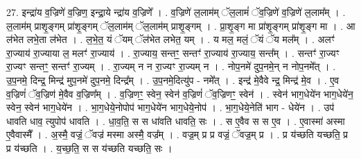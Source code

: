 \documentclass[17pt]{extarticle}
\begin{document}
27. इन्द्रा॑य व॒ज्रिणे॑ व॒ज्रिण॒ इन्द्रा॒ये न्द्रा॑य व॒ज्रिणे᳚ । . व॒ज्रिणे॑ ल॒लाम॑म् ॅल॒लामं॑ ॅव॒ज्रिणे॑ व॒ज्रिणे॑ ल॒लाम᳚म् । . ल॒लाम॑म् प्राशृ॒ङ्गम् प्रा॑शृ॒ङ्गम् ॅल॒लाम॑म् ॅल॒लाम॑म् प्राशृ॒ङ्गम् । . प्रा॒शृ॒ङ्ग मा प्रा॑शृ॒ङ्गम् प्रा॑शृ॒ङ्ग मा । . आ ल॑भेत लभे॒ता ल॑भेत । . ल॒भे॒त॒ यं ॅयम् ॅल॑भेत लभेत॒ यम् । . य मल॒ मलं॒ ॅयं ॅय मल᳚म् । . अलꣳ॑ रा॒ज्याय॑ रा॒ज्याया ल॒ मलꣳ॑ रा॒ज्याय॑ । . रा॒ज्याय॒ सन्तꣳ॒॒ सन्तꣳ॑ रा॒ज्याय॑ रा॒ज्याय॒ सन्त᳚म् । . सन्तꣳ॑ रा॒ज्यꣳ रा॒ज्यꣳ सन्तꣳ॒॒ सन्तꣳ॑ रा॒ज्यम् । . रा॒ज्यम् न न रा॒ज्यꣳ रा॒ज्यम् न । . नोप॒नमे॑ दुप॒नमे॒न् न नोप॒नमे᳚त् । . उ॒प॒नमे॒ दिन्द्र॒ मिन्द्र॑ मुप॒नमे॑ दुप॒नमे॒ दिन्द्र᳚म् । . उ॒प॒नमे॒दित्यु॑प - नमे᳚त् । . इन्द्र॑ मे॒वैवे न्द्र॒ मिन्द्र॑ मे॒व । . ए॒व व॒ज्रिणं॑ ॅव॒ज्रिण॑ मे॒वैव व॒ज्रिण᳚म् । . व॒ज्रिणꣳ॒॒ स्वेन॒ स्वेन॑ व॒ज्रिणं॑ ॅव॒ज्रिणꣳ॒॒ स्वेन॑ । . स्वेन॑ भाग॒धेये॑न भाग॒धेये॑न॒ स्वेन॒ स्वेन॑ भाग॒धेये॑न । . भा॒ग॒धेये॒नोपोप॑ भाग॒धेये॑न भाग॒धेये॒नोप॑ । . भा॒ग॒धेये॒नेति॑ भाग - धेये॑न । . उप॑ धावति धाव॒ त्युपोप॑ धावति । . धा॒व॒ति॒ स स धा॑वति धावति॒ सः । . स ए॒वैव स स ए॒व । . ए॒वास्मा॑ अस्मा ए॒वैवास्मै᳚ । . अ॒स्मै॒ वज्रं॒ ॅवज्र॑ मस्मा अस्मै॒ वज्र᳚म् । . वज्र॒म् प्र प्र वज्रं॒ ॅवज्र॒म् प्र । . प्र य॑च्छति यच्छति॒ प्र प्र य॑च्छति । . य॒च्छ॒ति॒ स स य॑च्छति यच्छति॒ सः । \newline
\end{document}
